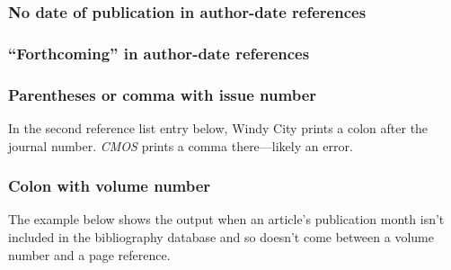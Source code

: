 \documentclass[11pt,letterpaper,oneside]{article}
\begin{document}
\subsubsection{No date of publication in author-date references}

\begin{citeref}
\item \parencite{nano1750}
\item \parencite{nano}
\end{citeref}

\subsubsection{``Forthcoming'' in author-date references}
\label{15.45}

\begin{citeref}
\item \parencite{faraday}
\end{citeref}

\setcounter{subsubsection}{46}
\subsubsection{Parentheses or comma with issue number}

In the second reference list entry below, Windy City prints a colon
after the journal number. \textit{CMOS} prints a comma there---likely
an error.

\begin{citeref}
\item \parencite{glass2014}
\item \parencite{meyerovitch1959}
\end{citeref}

\subsubsection{Colon with volume number}

The example below shows the output when an article's publication month
isn't included in the bibliography database and so doesn't come
between a volume number and a page reference.

\begin{citeref}
\item \parencite{gunderson2015}
\end{citeref}
\end{document}
